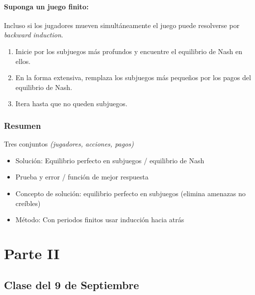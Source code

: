\documentclass[letterpaper,12pt,twocolumn]{report}
\begin{document}
\subsubsection*{Suponga un juego finito:}
Incluso si los jugadores mueven simultáneamente el juego puede resolverse por \textit{backward induction}.

\begin{enumerate}
	\item Inicie por los subjuegos más profundos y encuentre el equilibrio de Nash en ellos.
	\item En la forma extensiva, remplaza los subjuegos más pequeños por los pagos del equilibrio de Nash.
	\item Itera hasta que no queden subjuegos.
\end{enumerate}

 \subsection*{Resumen}
 
 \begin{tcolorbox}[title= Juego en forma normal]
 	Tres conjuntos \textit{(jugadores, acciones, pagos)}
 	
 	\begin{itemize}
 		\item Solución: Equilibrio perfecto en subjuegos / equilibrio de Nash
 		\item Prueba y error / función de mejor respuesta
 	\end{itemize}
 	
 \end{tcolorbox}
 
 \begin{tcolorbox}[title= Juegos en forma extensiva]
 	\begin{itemize}
 		\item Concepto de solución: equilibrio perfecto en subjuegos (elimina amenazas no creíbles)
 		\item Método: Con periodos finitos usar inducción hacia atrás
 	\end{itemize}
 \end{tcolorbox}
 
 
\chapter{Parte II}

\section{Clase del 9 de Septiembre}
\end{document}
